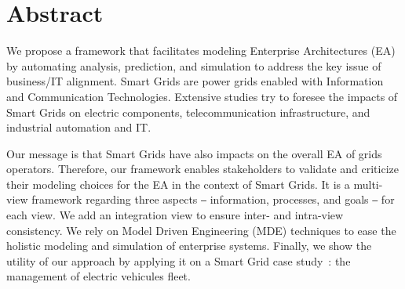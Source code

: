\chapter*{Abstract}

We propose a framework that facilitates modeling Enterprise Architectures (EA) by automating analysis, prediction, and simulation to address the key issue of business/IT alignment. Smart Grids are power grids enabled with Information and Communication Technologies. Extensive studies try to foresee the impacts of Smart Grids on electric components, telecommunication infrastructure, and industrial automation and IT.

Our message is that Smart Grids have also impacts on the overall EA of grids operators. Therefore, our framework enables stakeholders to validate and criticize their modeling choices for the EA in the context of Smart Grids. It is a multi-view framework regarding three aspects ⎯ information, processes, and goals ⎯ for each view. We add an integration view to ensure inter- and intra-view consistency. We rely on Model Driven Engineering (MDE) techniques to ease the holistic modeling and simulation of enterprise systems. Finally, we show the utility of our approach by applying it on a Smart Grid case study~: the management of electric vehicules fleet. 
